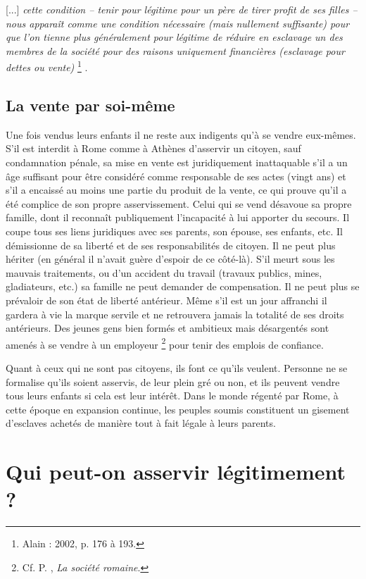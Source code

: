 {[...] \emph{cette condition -- tenir pour légitime pour un père de tirer profit de ses filles --
nous apparaît comme une condition nécessaire (mais nullement suffisante) pour que
l'on tienne plus généralement pour légitime de réduire en esclavage un des membres de
la société pour des raisons uniquement financières (esclavage pour dettes ou vente)}%
\footnote{Alain  : 2002, p. 176 à 193.}%
.}

\subsection{La vente par soi-même}

Une fois vendus leurs enfants il ne reste aux indigents qu'à se vendre
eux-mêmes. S'il est interdit à Rome comme à Athènes d'asservir un
citoyen, sauf condamnation pénale, sa mise en vente est juridiquement
inattaquable s'il a un âge suffisant pour être considéré comme responsable
de ses actes (vingt ans) et s'il a encaissé au moins une partie du
produit de la vente, ce qui prouve qu'il a été complice de son propre asservissement.
Celui qui se vend désavoue sa propre famille, dont il reconnaît
publiquement l'incapacité à lui apporter du secours. Il coupe
tous ses liens juridiques avec ses parents, son épouse, ses enfants, etc. Il
démissionne de sa liberté et de ses responsabilités de citoyen. Il ne peut
plus hériter (en général il n'avait guère d'espoir de ce côté-là). S'il meurt
sous les mauvais traitements, ou d'un accident du travail (travaux publics,
mines, gladiateurs, etc.) sa famille ne peut demander de compensation. Il
ne peut plus se prévaloir de son état de liberté antérieur. Même s'il est un
jour affranchi il gardera à vie la marque servile et ne retrouvera jamais la totalité
de ses droits antérieurs.
Des jeunes gens bien formés et ambitieux mais désargentés sont
amenés à se vendre à un employeur%
\footnote{Cf. P. , \emph{La société romaine}.}
pour tenir des emplois de confiance.

Quant à ceux qui ne sont pas citoyens, ils font ce qu'ils veulent.
Personne ne se formalise qu'ils soient asservis, de leur plein gré ou non,
et ils peuvent vendre tous leurs enfants si cela est leur intérêt. Dans le
monde régenté par Rome, à cette époque en expansion continue, les
peuples soumis constituent un gisement d'esclaves achetés de manière
tout à fait légale à leurs parents.


\section{Qui peut-on asservir légitimement ?}

